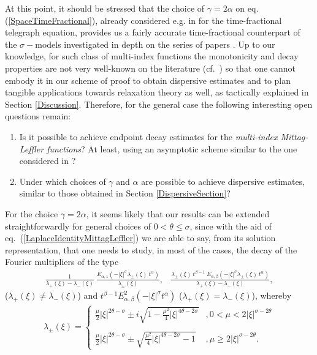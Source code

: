 \documentclass{amsart}
\theoremstyle{definition}
\theoremstyle{remark}
\numberwithin{equation}{section}
\begin{document}
{			At this point, it should be stressed that the choice of $\gamma=2\alpha$ on eq. (\ref{SpaceTimeFractional}), already considered e.g. in \cite{OrsingherBeghin04,LVaz20} for the time-fractional telegraph equation, provides us a fairly accurate time-fractional counterpart of the $\sigma-$models investigated in depth on the series of papers \cite{PMR15,AE17,AE_21,AE22}. Up to our knowledge, for such class of multi-index functions the monotonicity and decay properties are not very well-known on the literature (cf.~\cite[Chapter 6]{GKMaiR14}) so that one cannot embody it in our scheme of proof to obtain dispersive estimates and to plan tangible applications towards relaxation theory as well, as tactically explained in Section \ref{Discussion}.
			Therefore, for the general case the following interesting open questions remain:
			\begin{enumerate}
				\item[\bf Q1:] Is it possible to achieve endpoint decay estimates for the {\it multi-index Mittag-Leffler functions}? At least, using an asymptotic scheme similar to the one considered in \cite{KSZ17}?
				\item[\bf Q2:] Under which choices of $\gamma$ and $\alpha$ are possible to achieve dispersive estimates, similar to those obtained in Section \ref{DispersiveSection}?
			\end{enumerate}
			
			For the choice $\gamma=2\alpha$, it seems likely that our results can be extended straightforwardly for general choices of $0<\theta\leq \sigma$, since with the aid of eq.~(\ref{LaplaceIdentityMittagLeffler}) we are able to say, from its solution representation, that one needs to study, in most of the cases, the decay of the Fourier multipliers of the type 
			\begin{eqnarray*}
				\displaystyle \frac{1}{\lambda_+(\xi)-\lambda_-(\xi)}~\frac{E_{\alpha,1}\left(-|\xi|^{\sigma}\lambda_\pm(\xi)~t^{\alpha}\right)}{\lambda_\pm(\xi)},& \displaystyle \frac{\lambda_\pm(\xi)~t^{\beta-1}~E_{\alpha,\beta}\left(-|\xi|^{\sigma}\lambda_\pm(\xi)~t^{\alpha}\right) }{\lambda_+(\xi)-\lambda_-(\xi)},
			\end{eqnarray*} ($\lambda_+(\xi)\neq \lambda_-(\xi)$) and $t^{\beta-1}E_{\alpha,\beta}^2(-|\xi|^\sigma t^\alpha)$ ($\lambda_+(\xi)= \lambda_-(\xi)$), whereby
			\begin{eqnarray*}
				\lambda_{\pm}(\xi) =\begin{cases}
					\displaystyle \frac{\mu}{2}|\xi|^{2\theta-\sigma}\pm i\sqrt{1-\frac{\mu^2}{4}|\xi|^{4\theta-2\sigma}}&, 0< \mu<2|\xi|^{\sigma-2\theta} \\ \ \\
					\displaystyle \frac{\mu}{2}|\xi|^{2\theta-\sigma}\pm \sqrt{\frac{\mu^2}{4}|\xi|^{4\theta-2\sigma}-1} &, \mu\geq 2|\xi|^{\sigma-2\theta}. 
				\end{cases}
			\end{eqnarray*}
			
}
\end{document}
